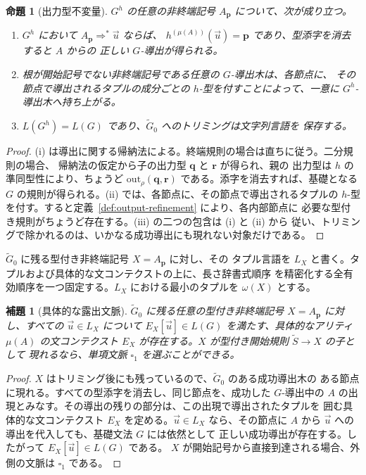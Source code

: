 \documentclass[11pt,a4paper]{ltjsarticle}
\newtheorem{lemma}[theorem]{補題}
\newtheorem{proposition}[theorem]{命題}
\theoremstyle{remark}
\newcommand{\out}{\mathrm{out}}
\newcommand{\tuple}[1]{\vec{#1}}
\newcommand{\blank}{\square}
\begin{document}
\begin{proposition}[出力型不変量]
\label{prop:output-invariants}
\(G^h\) の任意の非終端記号 \(A_{\mathbf p}\) について、次が成り立つ。
\begin{enumerate}[label=(\roman*),leftmargin=*]
\item \(G^h\) において \(A_{\mathbf p}\Rightarrow^*\tuple u\) ならば、
\(h^{(\mu(A))}(\tuple u)=\mathbf p\) であり、型添字を消去すると \(A\) からの
正しい \(G\)-導出が得られる。
\item 根が開始記号でない非終端記号である任意の \(G\)-導出木は、各節点に、
その節点で導出されるタプルの成分ごとの \(h\)-型を付すことによって、一意に
\(G^h\)-導出木へ持ち上がる。
\item \(L(G^h)=L(G)\) であり、\(\widetilde G_0\) へのトリミングは文字列言語を
保存する。
\end{enumerate}
\end{proposition}

\begin{proof}
(i) は導出に関する帰納法による。終端規則の場合は直ちに従う。二分規則の場合、
帰納法の仮定から子の出力型 \(\mathbf q\) と \(\mathbf r\) が得られ、親の
出力型は \(h\) の準同型性により、ちょうど
\(\out_\rho(\mathbf q,\mathbf r)\) である。添字を消去すれば、基礎となる
\(G\) の規則が得られる。(ii) では、各節点に、その節点で導出されるタプルの
\(h\)-型を付す。すると定義~\ref{def:output-refinement} により、各内部節点に
必要な型付き規則がちょうど存在する。(iii) の二つの包含は (i) と (ii) から
従い、トリミングで除かれるのは、いかなる成功導出にも現れない対象だけである。
\end{proof}

\(\widetilde G_0\) に残る型付き非終端記号 \(X=A_{\mathbf p}\) に対し、その
タプル言語を \(L_X\) と書く。タプルおよび具体的な文コンテクストの上に、長さ辞書式順序
を精密化する全有効順序を一つ固定する。\(L_X\) における最小のタプルを
\(\omega(X)\) とする。

\begin{lemma}[具体的な露出文脈]
\label{lem:exposing-contexts}
\(\widetilde G_0\) に残る任意の型付き非終端記号
\(X=A_{\mathbf p}\) に対し、すべての \(\tuple u\in L_X\) について
\(E_X[\tuple u]\in L(G)\) を満たす、具体的なアリティ \(\mu(A)\) の文コンテクスト
\(E_X\) が存在する。\(X\) が型付き開始規則 \(\widetilde S\to X\) の子として
現れるなら、単項文脈 \(\blank_1\) を選ぶことができる。
\end{lemma}

\begin{proof}
\(X\) はトリミング後にも残っているので、\(\widetilde G_0\) のある成功導出木の
ある節点に現れる。すべての型添字を消去し、同じ節点を、成功した \(G\)-導出中の
\(A\) の出現とみなす。その導出の残りの部分は、この出現で導出されたタプルを
囲む具体的な文コンテクスト \(E_X\) を定める。\(\tuple u\in L_X\) なら、その節点に
\(A\) から \(\tuple u\) への導出を代入しても、基礎文法 \(G\) には依然として
正しい成功導出が存在する。したがって \(E_X[\tuple u]\in L(G)\) である。
\(X\) が開始記号から直接到達される場合、外側の文脈は \(\blank_1\) である。
\end{proof}
\end{document}
